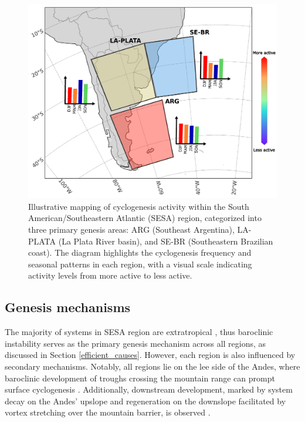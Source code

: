 \begin{figure}[h!]
\begin{center}
\setcaptionmargin{1cm}
\includegraphics[width=0.9\columnwidth,angle=0]{fig/genesis_regions.pdf}
\caption[Cyclogenesis regions in the South Atlantic]{Illustrative mapping of cyclogenesis activity within the South American/Southeastern Atlantic (SESA) region, categorized into three primary genesis areas: ARG (Southeast Argentina), LA-PLATA (La Plata River basin), and SE-BR (Southeastern Brazilian coast). The diagram highlights the cyclogenesis frequency and seasonal patterns in each region, with a visual scale indicating activity levels from more active to less active.}
\label{genesis_regions}
\end{center}
\end{figure}


\subsection{Genesis mechanisms}\label{genesis_mechanisms}

The majority of systems in SESA region are extratropical \citep{marrafon2022classificaccao}, thus baroclinic instability serves as the primary genesis mechanism across all regions, as discussed in Section \ref{efficient_causes}. However, each region is also influenced by secondary mechanisms. Notably, all regions lie on the lee side of the Andes, where baroclinic development of troughs crossing the mountain range can prompt surface cyclogenesis \citep{gan1994influence,vera2002cold,hoskins2005new,gramcianinov2019properties}. Additionally, downstream development, marked by system decay on the Andes' upslope and regeneration on the downslope facilitated by vortex stretching over the mountain barrier, is observed \citep{hoskins2005new}. 

